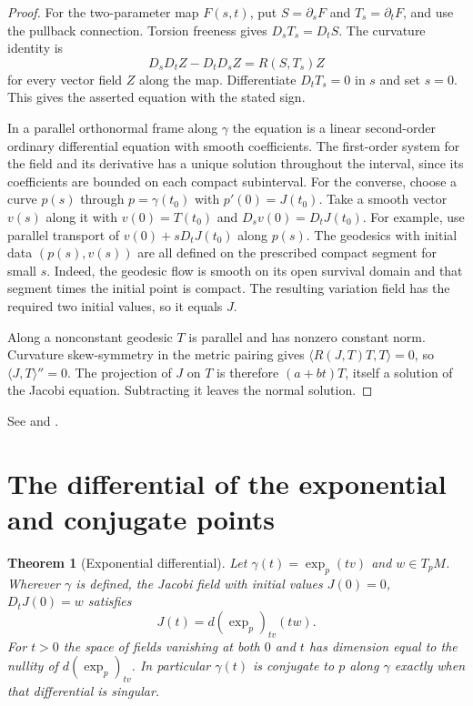 \documentclass[11pt,oneside,openany]{book}
\theoremstyle{plain}
\newtheorem{theorem}{Theorem}[chapter]
\theoremstyle{definition}
\theoremstyle{remark}
\begin{document}
\begin{proof}
For the two-parameter map \(F(s,t)\), put \(S=\partial_sF\)
and \(T_s=\partial_t F\), and use the pullback connection.
Torsion freeness gives \(D_sT_s=D_tS\).
The curvature identity is
\[
 D_sD_t Z-D_tD_s Z=R(S,T_s)Z
\]
for every vector field \(Z\) along the map. Differentiate
\(D_t T_s=0\) in \(s\) and set \(s=0\). This gives the asserted
equation with the stated sign.

In a parallel orthonormal frame along \(\gamma\) the equation is
a linear second-order ordinary differential equation with smooth
coefficients. The first-order system for the field and its
derivative has a unique solution throughout the interval, since
its coefficients are bounded on each compact subinterval.
For the converse, choose a curve \(p(s)\) through
\(p=\gamma(t_0)\) with \(p'(0)=J(t_0)\). Take a smooth vector
\(v(s)\) along it with \(v(0)=T(t_0)\) and
\(D_sv(0)=D_tJ(t_0)\). For example, use parallel transport of
\(v(0)+sD_tJ(t_0)\) along \(p(s)\). The geodesics with initial data
\((p(s),v(s))\) are all defined on the prescribed compact segment
for small \(s\). Indeed, the geodesic flow is smooth on its open
survival domain and that segment times the initial point is
compact. The resulting variation field has the required two
initial values, so it equals \(J\).

Along a nonconstant geodesic \(T\) is parallel and has nonzero
constant norm. Curvature skew-symmetry in the metric pairing
gives \(\langle R(J,T)T,T\rangle=0\), so
\(\langle J,T\rangle''=0\). The projection of \(J\) on \(T\)
is therefore \((a+bt)T\), itself a solution of the Jacobi
equation. Subtracting it leaves the normal solution.
\end{proof}

See \cite[Chapter 10, Proposition 10.4]{LeeRM} and
\cite[Chapter 5, Sections 2--3]{dC}.

\section{The differential of the exponential and conjugate points}
\label{p202:G17}

\begin{theorem}[Exponential differential]\label{thm:p202-exp-jacobi}
Let \(\gamma(t)=\exp_p(tv)\) and \(w\in T_pM\). Wherever
\(\gamma\) is defined, the Jacobi field with initial values
\(J(0)=0\), \(D_tJ(0)=w\) satisfies
\[
 J(t)=d(\exp_p)_{tv}(tw).
\]
For \(t>0\) the space of fields vanishing at both \(0\) and \(t\)
has dimension equal to the nullity of \(d(\exp_p)_{tv}\).
In particular \(\gamma(t)\) is conjugate to \(p\) along
\(\gamma\) exactly when that differential is singular.
\end{theorem}
\end{document}

